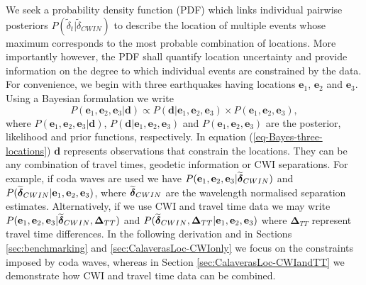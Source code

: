 \documentclass[extra, onecolumn, doublespacing]{gji}
\begin{document}
We seek a probability density function (PDF) which links
 individual pairwise posteriors $P(\widetilde{\delta}_t|\widetilde{\delta}_{CWIN})$
to describe the location of multiple events whose maximum corresponds to
 the most probable combination of locations.
More importantly however, the PDF shall
quantify location uncertainty and provide information
on the degree to which individual events are constrained
 by the data. For convenience, we begin with three earthquakes having locations
$\mathbf{e}_1$, $\mathbf{e}_2$ and $\mathbf{e}_3$. Using a Bayesian
formulation we write
\begin{equation}
\label{eq-Bayes-three-locations}
P(\mathbf{e}_1, \mathbf{e}_2, \mathbf{e}_3| \mathbf{d}) \propto P( \mathbf{d}|\mathbf{e}_1, \mathbf{e}_2, \mathbf{e}_3)
\times P(\mathbf{e}_1, \mathbf{e}_2, \mathbf{e}_3),
\end{equation}
where $P(\mathbf{e}_1, \mathbf{e}_2, \mathbf{e}_3 | \mathbf{d})$,
$P(\mathbf{d}|\mathbf{e}_1, \mathbf{e}_2, \mathbf{e}_3)$ and
$P(\mathbf{e}_1, \mathbf{e}_2, \mathbf{e}_3)$ are the posterior,
likelihood and prior functions, respectively. In equation
(\ref{eq-Bayes-three-locations}) $\mathbf{d}$ represents
observations that constrain the locations. They can be any
combination of travel times, geodetic information  or CWI
separations. For example, if coda waves are used we have
$P(\mathbf{e}_1, \mathbf{e}_2, \mathbf{e}_3 |
\widetilde{\mitbf{\delta}}_{CWIN})$ and
$P(\widetilde{\mitbf{\delta}}_{CWIN}|\mathbf{e}_1, \mathbf{e}_2,
\mathbf{e}_3)$, where $\widetilde{\mitbf{\delta}}_{CWIN}$ are the
wavelength normalised separation estimates. Alternatively, if we use
CWI and travel time data we may write $P(\mathbf{e}_1, \mathbf{e}_2,
\mathbf{e}_3 | \widetilde{\mitbf{\delta}}_{CWIN},
\mathbf{\Delta}_{TT})$ and
$P(\widetilde{\mitbf{\delta}}_{CWIN},\mathbf{\Delta}_{TT}|\mathbf{e}_1,
\mathbf{e}_2, \mathbf{e}_3)$ where $\mathbf{\Delta}_{TT}$ represent
travel time differences. In the following derivation and in Sections
\ref{sec:benchmarking} and \ref{sec:CalaverasLoc-CWIonly} we focus
on the constraints imposed by coda waves, whereas in Section
\ref{sec:CalaverasLoc-CWIandTT} we demonstrate how CWI and travel
time data can be combined.
\end{document}
